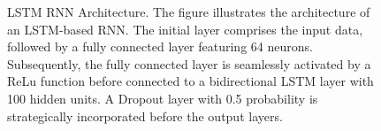 \begin{figure}[ht]
    \caption{\ac{LSTM} \ac{RNN} Architecture. The figure illustrates the architecture of an LSTM-based  RNN. The initial layer comprises the input data, followed by a fully connected layer featuring 64 neurons. Subsequently, the fully connected layer is seamlessly activated by a \ac{ReLu} function before connected to a bidirectional LSTM layer with 100 hidden units. A Dropout layer with 0.5 probability is strategically incorporated before the output layers. }
    \label{fig:lstmstruct}
\end{figure}
